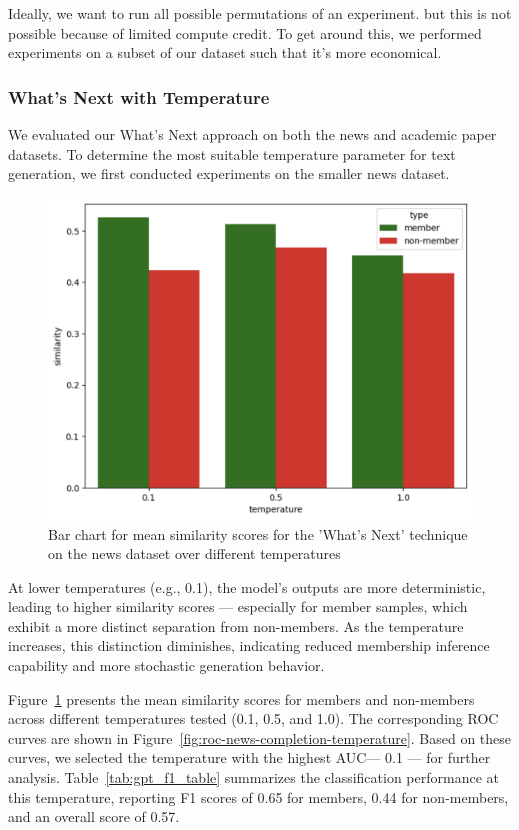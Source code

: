 \documentclass[sigconf]{acmart}
\begin{document}
Ideally, we want to run all possible permutations of an experiment. but this is not possible because of limited compute credit. To get around this, we performed experiments on a subset of our dataset such that it's more economical. 

\subsubsection{What's Next with Temperature}

We evaluated our What's Next approach on both the news and academic paper datasets. To determine the most suitable temperature parameter for text generation, we first conducted experiments on the smaller news dataset.

\begin{figure}[htp]
  \centering
  \includegraphics[width=\columnwidth]{figures/news-completion-temperature-bar.png}
    \caption{Bar chart for mean similarity scores for the 'What's Next'  technique on the news dataset over different temperatures}
    \label{fig:news-completion-temperature-bar}
\end{figure}

At lower temperatures (e.g., 0.1), the model's outputs are more deterministic, leading to higher similarity scores --- especially for member samples, which exhibit a more distinct separation from non-members. As the temperature increases, this distinction diminishes, indicating reduced membership inference capability and more stochastic generation behavior.

Figure~\ref{fig:news-completion-temperature-bar} presents the mean similarity scores for members and non-members across different temperatures tested (0.1, 0.5, and 1.0). The corresponding ROC curves are shown in Figure~\ref{fig:roc-news-completion-temperature}. Based on these curves, we selected the temperature with the highest AUC--- 0.1 --- for further analysis. Table~\ref{tab:gpt_f1_table} summarizes the classification performance at this temperature, reporting F1 scores of 0.65 for members, 0.44 for non-members, and an overall score of 0.57.
\end{document}

